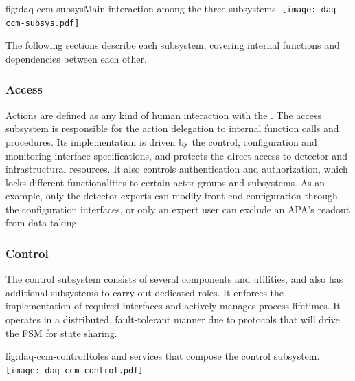 \begin{dunefigure}{fig:daq-ccm-subsys}{Main interaction among the three  subsystems.}
 \texttt{[image: daq-ccm-subsys.pdf]}
\end{dunefigure}

The following sections describe each  subsystem, covering internal functions and dependencies between each other.

\subsubsection{Access}
\label{sec:daq:design:ccm:access}
Actions are defined as any kind of human interaction with the . The access subsystem is responsible for the action delegation to internal function calls and procedures. Its implementation is driven by the control, configuration and monitoring interface specifications, and protects the direct access to detector and infrastructural resources. It also controls authentication and authorization, which locks different functionalities to certain actor groups and subsystems. As an example, only the detector experts can modify front-end configuration through the configuration interfaces, or only an expert user can exclude an APA's readout from data taking. 


\subsubsection{Control}
\label{sec:daq:design:ccm:control}

The control subsystem consists of several components and utilities, and also has additional subsystems to carry out dedicated roles. It enforces the implementation of required interfaces and actively manages  process lifetimes. It operates in a distributed, fault-tolerant manner due to protocols that will drive the FSM for state sharing. 

\begin{dunefigure}{fig:daq-ccm-control}{Roles and services that compose the  control subsystem.}
  \texttt{[image: daq-ccm-control.pdf]}
\end{dunefigure}

